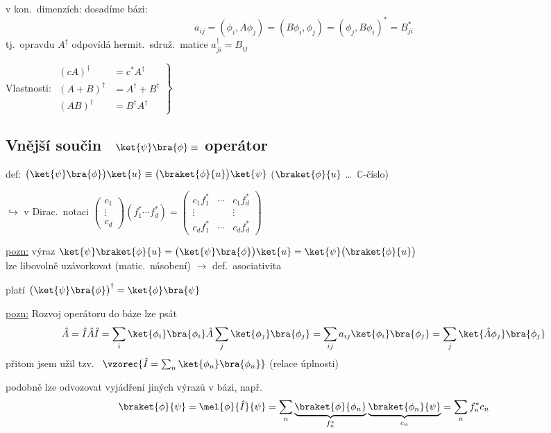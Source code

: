 \documentclass[11pt,a4paper]{article}
\begin{document}
v kon.\ dimenzích: dosadíme bázi:
\[
  a_{ij} = (\phi_i, A\phi_j) = (B\phi_i, \phi_j) = (\phi_j, B\phi_i)^* = B_{ji}^*
\]
tj.\ opravdu $A^\dagger$ odpovídá hermit.\ sdruž.\ matice \quad $a^\dagger_{ji} = B_{ij}$

Vlastnosti: \quad
$\left.\begin{aligned}
  (cA)^\dagger &= c^*A^\dagger \\
  (A+B)^\dagger &= A^\dagger + B^\dagger \\
  (AB)^\dagger &= B^\dagger A^\dagger
\end{aligned}\right\}$ \quad {} \quad {}

\subsection*{Vnější součin \ $\ket{\psi}\bra{\phi} \equiv$ operátor}
def: \quad $\big(\ket{\psi}\bra{\phi}\big)\ket{u} \equiv \big(\braket{\phi}{u}\big)\ket{\psi}$ \quad ($\braket{\phi}{u}$ \dots\ $\mathbb{C}$-číslo)

$\hookrightarrow$ v Dirac.\ notaci \quad
$\begin{pmatrix} c_1\\ \vdots\\ c_d\end{pmatrix}(f_1^*\cdots f_d^*) =
 \begin{pmatrix} c_1f_1^* & \cdots & c_1f_d^* \\ \vdots & & \vdots \\ c_df_1^* & \cdots & c_df_d^*\end{pmatrix}$

\underline{pozn:} výraz \quad $\ket{\psi}\braket{\phi}{u} = \big(\ket{\psi}\bra{\phi}\big)\ket{u} = \ket{\psi}\big(\braket{\phi}{u}\big)$ \\
\quad lze libovolně uzávorkovat (matic.\ násobení) $\to$ def.\ asociativita

platí \quad $\big(\ket{\psi}\bra{\phi}\big)^\dagger = \ket{\phi}\bra{\psi}$

\underline{pozn:} Rozvoj operátoru do báze lze psát
\[
  \hat A = \hat I\hat A\hat I = \sum_i \ket{\phi_i}\bra{\phi_i}\hat A\sum_j\ket{\phi_j}\bra{\phi_j}
  = \sum_{ij} a_{ij}\ket{\phi_i}\bra{\phi_j} = \sum_j \ket{\hat A\phi_j}\bra{\phi_j}
\]
přitom jsem užil tzv.\  \quad $\vzorec{\hat I = \sum_n \ket{\phi_n}\bra{\phi_n}}$ \quad (relace úplnosti)

podobně lze odvozovat vyjádření jiných výrazů v bázi, např.
\[
  \braket{\phi}{\psi} = \mel{\phi}{\hat I}{\psi} = \sum_n \underbrace{\braket{\phi}{\phi_n}}_{f_n^*}\underbrace{\braket{\phi_n}{\psi}}_{c_n} = \sum_n f_n^* c_n
\]
\end{document}
